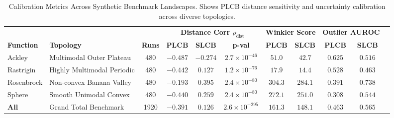 \begin{table}[htbp]
\centering
\caption{Calibration Metrics Across Synthetic Benchmark Landscapes. Shows PLCB distance sensitivity and uncertainty calibration across diverse topologies.}
\label{tab:objective_breakdown}
\small
\begin{tabular}{ll ccc ccc ccc}
\toprule
 & & & \multicolumn{3}{c}{\textbf{Distance Corr $\rho_{\text{dist}}$}} & \multicolumn{2}{c}{\textbf{Winkler Score}} & \multicolumn{2}{c}{\textbf{Outlier AUROC}} \\
\cmidrule(lr){4-6} \cmidrule(lr){7-8} \cmidrule(lr){9-10}
\textbf{Function} & \textbf{Topology} & \textbf{Runs} & \textbf{PLCB} & \textbf{SLCB} & \textbf{p-val} & \textbf{PLCB} & \textbf{SLCB} & \textbf{PLCB} & \textbf{SLCB} \\
\midrule
Ackley & Multimodal Outer Plateau & 480 & $-0.487$ & $-0.274$ & $2.7 \times 10^{-46}$ & $51.0$ & $42.7$ & $0.625$ & $0.516$ \\
Rastrigin & Highly Multimodal Periodic & 480 & $-0.442$ & $0.127$ & $1.2 \times 10^{-76}$ & $17.9$ & $14.4$ & $0.528$ & $0.463$ \\
Rosenbrock & Non-convex Banana Valley & 480 & $-0.193$ & $0.395$ & $2.4 \times 10^{-80}$ & $304.3$ & $284.1$ & $0.391$ & $0.738$ \\
Sphere & Smooth Unimodal Convex & 480 & $-0.440$ & $0.259$ & $2.4 \times 10^{-80}$ & $272.1$ & $251.0$ & $0.308$ & $0.544$ \\
\textbf{All} & Grand Total Benchmark & 1920 & $-0.391$ & $0.126$ & $2.6 \times 10^{-295}$ & $161.3$ & $148.1$ & $0.463$ & $0.565$ \\
\bottomrule
\end{tabular}
\end{table}